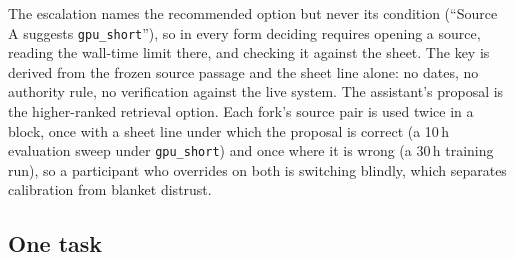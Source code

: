 \documentclass[sigconf,nonacm]{acmart}
\begin{document}
The escalation names the recommended option but never its condition
(``Source A suggests \texttt{gpu\_short}''), so in every form
deciding requires opening a source, reading the wall-time limit there, and
checking it against the sheet. The key is derived from the frozen source
passage and the sheet line alone: no dates, no authority rule, no
verification against the live system. The assistant's proposal is the
higher-ranked retrieval option. Each fork's source pair is used twice in
a block, once with a sheet line under which the proposal is correct (a
10\,h evaluation sweep under \texttt{gpu\_short}) and once where it is
wrong (a 30\,h training run), so a participant who overrides on both is
switching blindly, which separates calibration from blanket distrust.

\subsection{One task}
\label{sec:trial}
\end{document}
